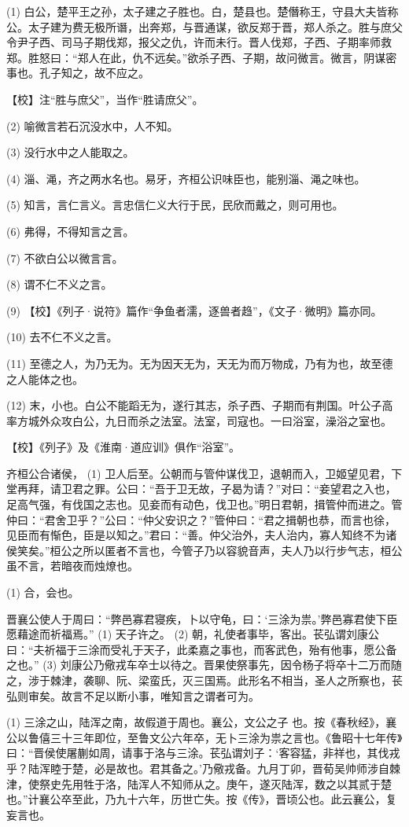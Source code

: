 \documentclass[12pt,UTF8]{ctexbook}
\begin{document}
(1) 白公，楚平王之孙，太子建之子胜也。白，楚县也。楚僭称王，守县大夫皆称公。太子建为费无极所谮，出奔郑，与晋通谋，欲反郑于晋，郑人杀之。胜与庶父令尹子西、司马子期伐郑，报父之仇，许而未行。晋人伐郑，子西、子期率师救郑。胜怒曰：“郑人在此，仇不远矣。”欲杀子西、子期，故问微言。微言，阴谋密事也。孔子知之，故不应之。

【校】注“胜与庶父”，当作“胜请庶父”。

(2) 喻微言若石沉没水中，人不知。

(3) 没行水中之人能取之。

(4) 淄、渑，齐之两水名也。易牙，齐桓公识味臣也，能别淄、渑之味也。

(5) 知言，言仁言义。言忠信仁义大行于民，民欣而戴之，则可用也。

(6) 弗得，不得知言之言。

(7) 不欲白公以微言言。

(8) 谓不仁不义之言。

(9) 【校】《列子·说符》篇作“争鱼者濡，逐兽者趋”，《文子·微明》篇亦同。

(10) 去不仁不义之言。

(11) 至德之人，为乃无为。无为因天无为，天无为而万物成，乃有为也，故至德之人能体之也。

(12) 末，小也。白公不能蹈无为，遂行其志，杀子西、子期而有荆国。叶公子高率方城外众攻白公，九日而杀之法室。法室，司寇也。一曰浴室，澡浴之室也。

【校】《列子》及《淮南·道应训》俱作“浴室”。

齐桓公合诸侯， (1) 卫人后至。公朝而与管仲谋伐卫，退朝而入，卫姬望见君，下堂再拜，请卫君之罪。公曰：“吾于卫无故，子曷为请？”对曰：“妾望君之入也，足高气强，有伐国之志也。见妾而有动色，伐卫也。”明日君朝，揖管仲而进之。管仲曰：“君舍卫乎？”公曰：“仲父安识之？”管仲曰：“君之揖朝也恭，而言也徐，见臣而有惭色，臣是以知之。”君曰：“善。仲父治外，夫人治内，寡人知终不为诸侯笑矣。”桓公之所以匿者不言也，今管子乃以容貌音声，夫人乃以行步气志，桓公虽不言，若暗夜而烛燎也。

(1) 合，会也。

晋襄公使人于周曰：“弊邑寡君寝疾，卜以守龟，曰：‘三涂为祟。’弊邑寡君使下臣愿藉途而祈福焉。” (1) 天子许之。 (2) 朝，礼使者事毕，客出。苌弘谓刘康公曰：“夫祈福于三涂而受礼于天子，此柔嘉之事也，而客武色，殆有他事，愿公备之也。” (3) 刘康公乃儆戎车卒士以待之。晋果使祭事先，因令杨子将卒十二万而随之，涉于棘津，袭聊、阮、梁蛮氏，灭三国焉。此形名不相当，圣人之所察也，苌弘则审矣。故言不足以断小事，唯知言之谓者可为。

(1) 三涂之山，陆浑之南，故假道于周也。襄公，文公之子 也。按《春秋经》，襄公以鲁僖三十三年即位，至鲁文公六年卒，无卜三涂为祟之言也。《鲁昭十七年传》曰：“晋侯使屠蒯如周，请事于洛与三涂。苌弘谓刘子：‘客容猛，非祥也，其伐戎乎？陆浑睦于楚，必是故也。君其备之。’乃儆戎备。九月丁卯，晋荀吴帅师涉自棘津，使祭史先用牲于洛，陆浑人不知师从之。庚午，遂灭陆浑，数之以其贰于楚也。”计襄公卒至此，乃九十六年，历世亡失。按《传》，晋顷公也。此云襄公，复妄言也。
\end{document}
